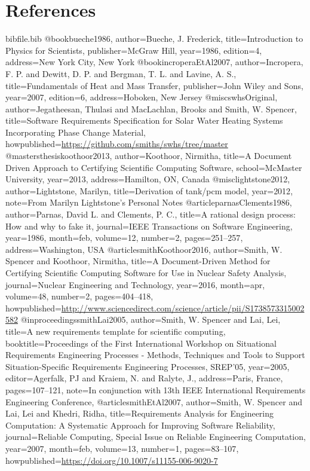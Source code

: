 \documentclass[12pt]{article}
\begin{document}
\section{References}
\label{Sec:References}
\begin{filecontents*}{bibfile.bib}
@book{bueche1986,
author={Bueche, J. Frederick},
title={Introduction to Physics for Scientists},
publisher={McGraw Hill},
year={1986},
edition={4},
address={New York City, New York}}
@book{incroperaEtAl2007,
author={Incropera, F. P. and Dewitt, D. P. and Bergman, T. L. and Lavine, A. S.},
title={Fundamentals of Heat and Mass Transfer},
publisher={John Wiley and Sons},
year={2007},
edition={6},
address={Hoboken, New Jersey}}
@misc{swhsOriginal,
author={Jegatheesan, Thulasi and MacLachlan, Brooks and Smith, W. Spencer},
title={Software Requirements Specification for Solar Water Heating Systems Incorporating Phase Change Material},
howpublished={\url{https://github.com/smiths/swhs/tree/master}}}
@mastersthesis{koothoor2013,
author={Koothoor, Nirmitha},
title={A Document Driven Approach to Certifying Scientific Computing Software},
school={McMaster University},
year={2013},
address={Hamilton, ON, Canada}}
@misc{lightstone2012,
author={Lightstone, Marilyn},
title={Derivation of tank/pcm model},
year={2012},
note={From Marilyn Lightstone's Personal Notes}}
@article{parnasClements1986,
author={Parnas, David L. and Clements, P. C.},
title={A rational design process: How and why to fake it},
journal={IEEE Transactions on Software Engineering},
year={1986},
month=feb,
volume={12},
number={2},
pages={251--257},
address={Washington, USA}}
@article{smithKoothoor2016,
author={Smith, W. Spencer and Koothoor, Nirmitha},
title={A Document-Driven Method for Certifying Scientific Computing Software for Use in Nuclear Safety Analysis},
journal={Nuclear Engineering and Technology},
year={2016},
month=apr,
volume={48},
number={2},
pages={404--418},
howpublished={\url{http://www.sciencedirect.com/science/article/pii/S1738573315002582}}}
@inproceedings{smithLai2005,
author={Smith, W. Spencer and Lai, Lei},
title={A new requirements template for scientific computing},
booktitle={Proceedings of the First International Workshop on Situational Requirements Engineering Processes - Methods, Techniques and Tools to Support Situation-Specific Requirements Engineering Processes, SREP'05},
year={2005},
editor={Agerfalk, PJ and Kraiem, N. and Ralyte, J.},
address={Paris, France},
pages={107--121},
note={In conjunction with 13th IEEE International Requirements Engineering Conference,}}
@article{smithEtAl2007,
author={Smith, W. Spencer and Lai, Lei and Khedri, Ridha},
title={Requirements Analysis for Engineering Computation: A Systematic Approach for Improving Software Reliability},
journal={Reliable Computing, Special Issue on Reliable Engineering Computation},
year={2007},
month=feb,
volume={13},
number={1},
pages={83--107},
howpublished={\url{https://doi.org/10.1007/s11155-006-9020-7}}}
\end{filecontents*}
\nocite{*}
\printbibliography[heading=none]
\end{document}
